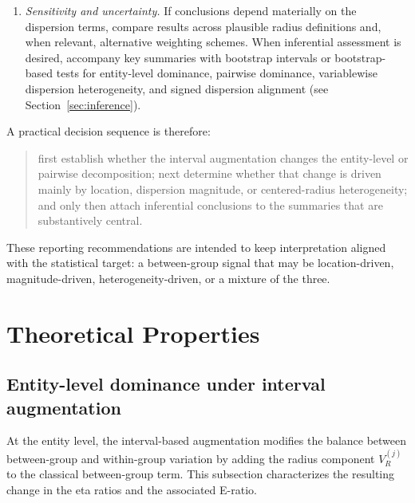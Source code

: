 \documentclass[preprint, times, 12pt, authoryear]{elsarticle}
\begin{document}
\begin{enumerate}[label=(\alph*)]
	\item \emph{Sensitivity and uncertainty.}
	If conclusions depend materially on the dispersion terms, compare results across plausible radius definitions and, when relevant, alternative weighting schemes. When inferential assessment is desired, accompany key summaries with bootstrap intervals or bootstrap-based tests for entity-level dominance, pairwise dominance, variablewise dispersion heterogeneity, and signed dispersion alignment (see Section~\ref{sec:inference}).
\end{enumerate}

A practical decision sequence is therefore:
\begin{quote}
	first establish whether the interval augmentation changes the entity-level or pairwise decomposition; next determine whether that change is driven mainly by location, dispersion magnitude, or centered-radius heterogeneity; and only then attach inferential conclusions to the summaries that are substantively central.
\end{quote}

These reporting recommendations are intended to keep interpretation aligned with the statistical target: a between-group signal that may be location-driven, magnitude-driven, heterogeneity-driven, or a mixture of the three.
 
 \section{Theoretical Properties}\label{sec:theory}
 
 \subsection{Entity-level dominance under interval augmentation}\label{sec:eta_theory}
 
 At the entity level, the interval-based augmentation modifies the balance between between-group and within-group variation by adding the radius component $V_R^{(j)}$ to the classical between-group term. This subsection characterizes the resulting change in the eta ratios and the associated E-ratio.
 
\end{document}
